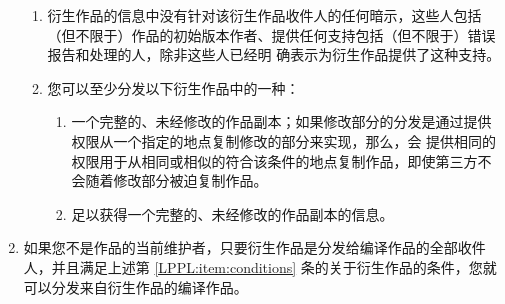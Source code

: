 \begin{LPPLicense}
\begin{enumerate}
\begin{enumerate}
                \item 衍生作品的信息中没有针对该衍生作品收件人的任何暗示，这些人包括（但不限于）作品的初始版本作者、提供任何支持包括（但不限于）错误报告和处理的人，除非这些人已经明 确表示为衍生作品提供了这种支持。
                \item 您可以至少分发以下衍生作品中的一种：
                    \begin{enumerate}
                        \item 一个完整的、未经修改的作品副本；如果修改部分的分发是通过提供权限从一个指定的地点复制修改的部分来实现，那么，会 提供相同的权限用于从相同或相似的符合该条件的地点复制作品，即使第三方不会随着修改部分被迫复制作品。
                        \item 足以获得一个完整的、未经修改的作品副本的信息。
                    \end{enumerate}
            \end{enumerate}
        \item 如果您不是作品的当前维护者，只要衍生作品是分发给编译作品的全部收件人，并且满足上述第 \ref{LPPL:item:conditions} 条的关于衍生作品的条件，您就可以分发来自衍生作品的编译作品。

\end{enumerate}
\end{LPPLicense}
